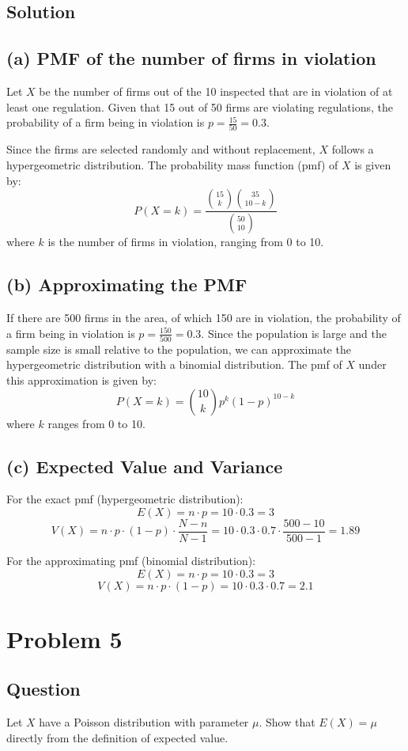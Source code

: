 \documentclass{article}
\begin{document}
\subsection*{Solution}
\subsection*{(a) PMF of the number of firms in violation}

Let \(X\) be the number of firms out of the 10 inspected that are in violation of at least one regulation. Given that 15 out of 50 firms are violating regulations, the probability of a firm being in violation is \(p = \frac{15}{50} = 0.3\).

Since the firms are selected randomly and without replacement, \(X\) follows a hypergeometric distribution. The probability mass function (pmf) of \(X\) is given by:
\[
P(X = k) = \frac{\binom{15}{k} \binom{35}{10-k}}{\binom{50}{10}}
\]
where \(k\) is the number of firms in violation, ranging from 0 to 10.

\subsection*{(b) Approximating the PMF}

If there are 500 firms in the area, of which 150 are in violation, the probability of a firm being in violation is \(p = \frac{150}{500} = 0.3\). Since the population is large and the sample size is small relative to the population, we can approximate the hypergeometric distribution with a binomial distribution. The pmf of \(X\) under this approximation is given by:
\[
P(X = k) = \binom{10}{k} p^k (1-p)^{10-k}
\]
where \(k\) ranges from 0 to 10.

\subsection*{(c) Expected Value and Variance}
For the exact pmf (hypergeometric distribution):
\[
E(X) = n \cdot p = 10 \cdot 0.3 = 3
\]
\[
V(X) = n \cdot p \cdot (1-p) \cdot \frac{N-n}{N-1} = 10 \cdot 0.3 \cdot 0.7 \cdot \frac{500-10}{500-1} = 1.89
\]

For the approximating pmf (binomial distribution):
\[
E(X) = n \cdot p = 10 \cdot 0.3 = 3
\]
\[
V(X) = n \cdot p \cdot (1-p) = 10 \cdot 0.3 \cdot 0.7 = 2.1
\]
\section*{Problem 5}
\subsection*{Question}
Let \( X \) have a Poisson distribution with parameter \( \mu \). Show that \( E(X) = \mu \) directly from the definition of expected value.
\end{document}
